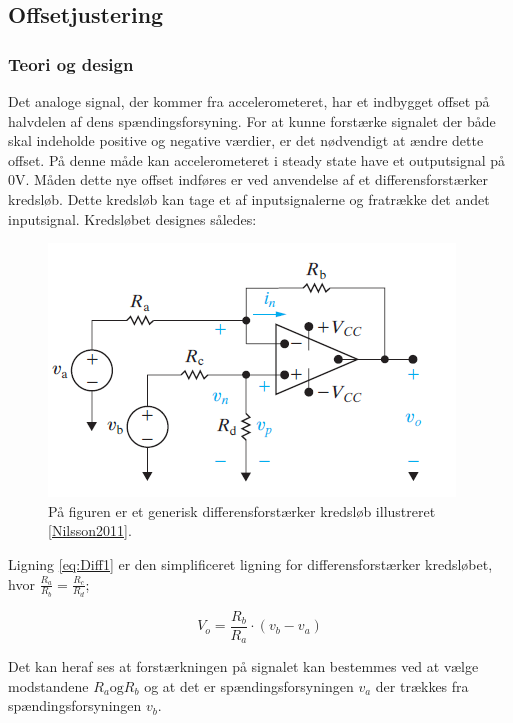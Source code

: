 \subsection{Offsetjustering}
\subsubsection{Teori og design}
Det analoge signal, der kommer fra accelerometeret, har et indbygget offset på halvdelen af dens spændingsforsyning. For at kunne forstærke signalet der både skal indeholde positive og negative værdier, er det nødvendigt at ændre dette offset. På denne måde kan  accelerometeret i steady state have et outputsignal på $0$V. Måden dette nye offset indføres er ved anvendelse af et differensforstærker kredsløb. Dette kredsløb kan tage et af inputsignalerne og  fratrække det  andet inputsignal. Kredsløbet designes således:

\begin{figure}[H]
\centering
\includegraphics[scale=1]{figures/cProblemloesning/Differensforstaerker_generisk.png}
\caption{På figuren er et generisk differensforstærker kredsløb illustreret \ref{Nilsson2011}.}
\label{fig:Differensforstaerker_generisk}
\end{figure}

Ligning \ref{eq:Diff1} er den simplificeret ligning for differensforstærker kredsløbet, hvor $\frac{R_a}{R_b} = \frac{R_c}{R_d}$;

\begin{equation}\label{eq:Diff1}
V_o = \frac{R_b}{R_a} \cdot (v_b - v_a)
\end{equation}

Det kan heraf ses at forstærkningen på signalet kan bestemmes ved at vælge modstandene $R_a \text{og} R_b$ og at det er spændingsforsyningen $v_a$ der trækkes fra spændingsforsyningen $v_b$. 

